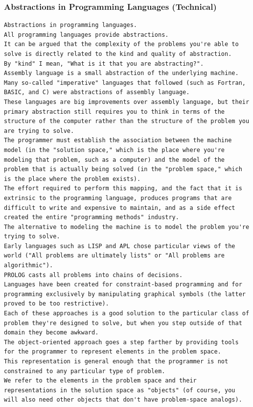 \documentclass[BTech]{nitgoathesis}
\begin{document}
\subsubsection{Abstractions in Programming Languages (Technical)}
\begin{lstlisting}[basicstyle=\scriptsize]
Abstractions in programming languages.
All programming languages provide abstractions.
It can be argued that the complexity of the problems you're able to solve is directly related to the kind and quality of abstraction.
By "kind" I mean, "What is it that you are abstracting?".
Assembly language is a small abstraction of the underlying machine.
Many so-called "imperative" languages that followed (such as Fortran, BASIC, and C) were abstractions of assembly language.
These languages are big improvements over assembly language, but their primary abstraction still requires you to think in terms of the structure of the computer rather than the structure of the problem you are trying to solve.
The programmer must establish the association between the machine model (in the "solution space," which is the place where you're modeling that problem, such as a computer) and the model of the problem that is actually being solved (in the "problem space," which is the place where the problem exists).
The effort required to perform this mapping, and the fact that it is extrinsic to the programming language, produces programs that are difficult to write and expensive to maintain, and as a side effect created the entire "programming methods" industry.
The alternative to modeling the machine is to model the problem you're trying to solve.
Early languages such as LISP and APL chose particular views of the world ("All problems are ultimately lists" or "All problems are algorithmic").
PROLOG casts all problems into chains of decisions. 
Languages have been created for constraint-based programming and for programming exclusively by manipulating graphical symbols (the latter proved to be too restrictive).
Each of these approaches is a good solution to the particular class of problem they're designed to solve, but when you step outside of that domain they become awkward.
The object-oriented approach goes a step farther by providing tools for the programmer to represent elements in the problem space.
This representation is general enough that the programmer is not constrained to any particular type of problem.
We refer to the elements in the problem space and their representations in the solution space as "objects" (of course, you will also need other objects that don't have problem-space analogs).

\end{lstlisting}
\end{document}
